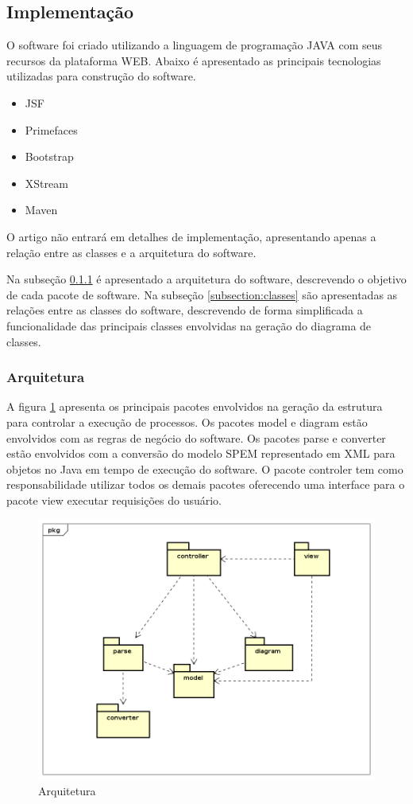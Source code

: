 \subsection{Implementação}\label{ferramentaImplementacao}
O software foi criado utilizando a linguagem de programação JAVA com seus recursos da plataforma WEB. Abaixo é apresentado as principais tecnologias utilizadas para construção do software.
\begin{itemize}
	\item JSF
	\item Primefaces
	\item Bootstrap
	\item XStream
	\item Maven
\end{itemize}

O artigo não entrará em detalhes de implementação, apresentando apenas a relação entre as classes e a arquitetura do software.

Na subseção \ref{subsection:arquitetura} é apresentado a arquitetura do software, descrevendo o objetivo de cada pacote de software. Na subseção \ref{subsection:classes} são apresentadas as relações entre as classes do software, descrevendo de forma simplificada a funcionalidade das principais classes envolvidas na geração do diagrama de classes.

\subsubsection{Arquitetura}\label{subsection:arquitetura}
A figura \ref{figura:figuraArquitetura} apresenta os principais pacotes envolvidos na geração da estrutura para controlar a execução de processos. Os pacotes model e diagram estão envolvidos com as regras de negócio do software. Os pacotes parse e converter estão envolvidos com a conversão do modelo SPEM representado em XML para objetos no Java em tempo de execução do software.
O pacote controler tem como responsabilidade utilizar todos os demais pacotes oferecendo uma interface para o pacote view executar requisições do usuário. 

\begin{figure}[!htb]
	\caption{Arquitetura}
	\label{figura:figuraArquitetura}
	\centering
	\includegraphics[width=1\textwidth]{img/ferramenta_arquitetura.png}
\end{figure}
